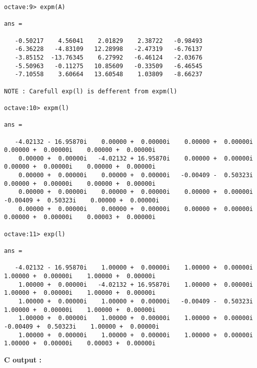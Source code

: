 \documentclass{article}
\begin{document}
\begin{small}
\begin{verbatim}
octave:9> expm(A)

ans =

   -0.50217    4.56041    2.01829    2.38722   -0.98493
   -6.36228   -4.83109   12.28998   -2.47319   -6.76137
   -3.85152  -13.76345    6.27992   -6.46124   -2.03676
   -5.50963   -0.11275   10.85609   -0.33509   -6.46545
   -7.10558    3.60664   13.60548    1.03809   -8.66237

NOTE : Carefull exp(l) is defferent from expm(l)

octave:10> expm(l)

ans =

   -4.02132 - 16.95870i    0.00000 +  0.00000i    0.00000 +  0.00000i    0.00000 +  0.00000i    0.00000 +  0.00000i
    0.00000 +  0.00000i   -4.02132 + 16.95870i    0.00000 +  0.00000i    0.00000 +  0.00000i    0.00000 +  0.00000i
    0.00000 +  0.00000i    0.00000 +  0.00000i   -0.00409 -  0.50323i    0.00000 +  0.00000i    0.00000 +  0.00000i
    0.00000 +  0.00000i    0.00000 +  0.00000i    0.00000 +  0.00000i   -0.00409 +  0.50323i    0.00000 +  0.00000i
    0.00000 +  0.00000i    0.00000 +  0.00000i    0.00000 +  0.00000i    0.00000 +  0.00000i    0.00003 +  0.00000i

octave:11> exp(l)

ans =

   -4.02132 - 16.95870i    1.00000 +  0.00000i    1.00000 +  0.00000i    1.00000 +  0.00000i    1.00000 +  0.00000i
    1.00000 +  0.00000i   -4.02132 + 16.95870i    1.00000 +  0.00000i    1.00000 +  0.00000i    1.00000 +  0.00000i
    1.00000 +  0.00000i    1.00000 +  0.00000i   -0.00409 -  0.50323i    1.00000 +  0.00000i    1.00000 +  0.00000i
    1.00000 +  0.00000i    1.00000 +  0.00000i    1.00000 +  0.00000i   -0.00409 +  0.50323i    1.00000 +  0.00000i
    1.00000 +  0.00000i    1.00000 +  0.00000i    1.00000 +  0.00000i    1.00000 +  0.00000i    0.00003 +  0.00000i
\end{verbatim} 
\end{small}

\begin{large}\textbf{C output :}\end{large}
\end{document}
